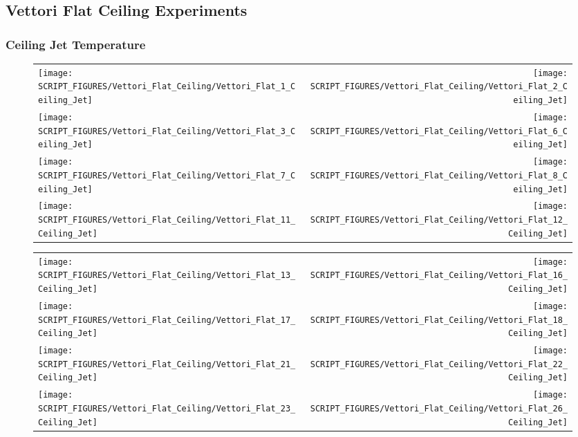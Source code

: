 \clearpage

\subsection{Vettori Flat Ceiling Experiments}

\subsubsection{Ceiling Jet Temperature}

\begin{figure}[p]
\begin{tabular*}{\textwidth}{l@{\extracolsep{\fill}}r}
\texttt{[image: SCRIPT\_FIGURES/Vettori\_Flat\_Ceiling/Vettori\_Flat\_1\_Ceiling\_Jet]} &
\texttt{[image: SCRIPT\_FIGURES/Vettori\_Flat\_Ceiling/Vettori\_Flat\_2\_Ceiling\_Jet]} \\
\texttt{[image: SCRIPT\_FIGURES/Vettori\_Flat\_Ceiling/Vettori\_Flat\_3\_Ceiling\_Jet]} &
\texttt{[image: SCRIPT\_FIGURES/Vettori\_Flat\_Ceiling/Vettori\_Flat\_6\_Ceiling\_Jet]} \\
\texttt{[image: SCRIPT\_FIGURES/Vettori\_Flat\_Ceiling/Vettori\_Flat\_7\_Ceiling\_Jet]} &
\texttt{[image: SCRIPT\_FIGURES/Vettori\_Flat\_Ceiling/Vettori\_Flat\_8\_Ceiling\_Jet]} \\
\texttt{[image: SCRIPT\_FIGURES/Vettori\_Flat\_Ceiling/Vettori\_Flat\_11\_Ceiling\_Jet]} &
\texttt{[image: SCRIPT\_FIGURES/Vettori\_Flat\_Ceiling/Vettori\_Flat\_12\_Ceiling\_Jet]}
\end{tabular*}
\end{figure}

\begin{figure}[p]
\begin{tabular*}{\textwidth}{l@{\extracolsep{\fill}}r}
\texttt{[image: SCRIPT\_FIGURES/Vettori\_Flat\_Ceiling/Vettori\_Flat\_13\_Ceiling\_Jet]} &
\texttt{[image: SCRIPT\_FIGURES/Vettori\_Flat\_Ceiling/Vettori\_Flat\_16\_Ceiling\_Jet]} \\
\texttt{[image: SCRIPT\_FIGURES/Vettori\_Flat\_Ceiling/Vettori\_Flat\_17\_Ceiling\_Jet]} &
\texttt{[image: SCRIPT\_FIGURES/Vettori\_Flat\_Ceiling/Vettori\_Flat\_18\_Ceiling\_Jet]} \\
\texttt{[image: SCRIPT\_FIGURES/Vettori\_Flat\_Ceiling/Vettori\_Flat\_21\_Ceiling\_Jet]} &
\texttt{[image: SCRIPT\_FIGURES/Vettori\_Flat\_Ceiling/Vettori\_Flat\_22\_Ceiling\_Jet]} \\
\texttt{[image: SCRIPT\_FIGURES/Vettori\_Flat\_Ceiling/Vettori\_Flat\_23\_Ceiling\_Jet]} &
\texttt{[image: SCRIPT\_FIGURES/Vettori\_Flat\_Ceiling/Vettori\_Flat\_26\_Ceiling\_Jet]}
\end{tabular*}
\end{figure}

